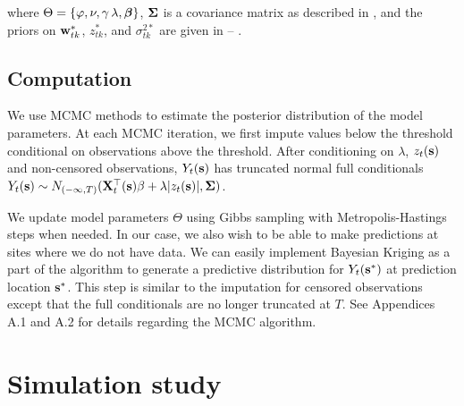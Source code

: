 where $\Theta = \{\varphi, \nu, \gamma\, \lambda, \mbox{\boldmath $\beta$}\}$, $\mbox{\boldmath $\Sigma$}$ is a \Matern covariance matrix as described in , and the priors on $\mathbf{w}^*_{tk}$, $z^*_{tk}$, and $\sigma^{2*}_{tk}$ are given in  -- .

\subsection{Computation}\label{sts:comp}

We use MCMC methods to estimate the posterior distribution of the model parameters.
At each MCMC iteration, we first impute values below the threshold conditional on observations above the threshold.
After conditioning on $\lambda$, $z_t(\mathbf{s})$ and non-censored observations, $Y_t(\mathbf{s})$ has truncated normal full conditionals $Y_t(\mathbf{s}) \sim N_{(-\infty, T)}(\mathbf{X}_t^\top(\mathbf{s}) \beta + \lambda | z_t(\mathbf{s})|, \mbox{\boldmath $\Sigma$})$.

We update model parameters $\Theta$ using Gibbs sampling with Metropolis-Hastings steps when needed.
In our case, we also wish to be able to make predictions at sites where we do not have data.
We can easily implement Bayesian Kriging as a part of the algorithm to generate a predictive distribution for $Y_t(\mathbf{s}^*)$ at prediction location $\mathbf{s}^*$.
This step is similar to the imputation for censored observations except that the full conditionals are no longer truncated at $T$.
See Appendices A.1 and A.2 for details regarding the MCMC algorithm.

\section{Simulation study}\label{sts:simstudy}

